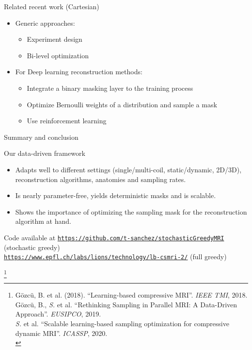 \begin{frame}{Related recent work (Cartesian) }


\begin{itemize}
\item Generic approaches:
\begin{itemize}
\item Experiment design \parencite{haldar2019oedipus}
\item Bi-level optimization \parencite{sherry2019learning}
\end{itemize}
\pause
\item For Deep learning reconstruction methods:
\begin{itemize}
\item Integrate a binary masking layer to the training process \parencite{weiss2019learning}
\item Optimize Bernoulli weights of a distribution and sample a mask \parencite{bahadir2019learning}
\item Use reinforcement learning \parencite{jin2019self}
\end{itemize}
\end{itemize}
\end{frame}
\begin{frame}{Summary and conclusion}
\begin{block}{Our data-driven framework}
\begin{itemize}
\item Adapts well to different settings (single/multi-coil, static/dynamic, 2D/3D), reconstruction algorithms, anatomies and sampling rates. 
\item Is nearly parameter-free, yields deterministic masks and is scalable.
\item Shows the importance of optimizing the sampling mask for the reconstruction algorithm at hand.
\end{itemize}
\end{block}

Code available at \href{https://github.com/t-sanchez/stochasticGreedyMRI}{\texttt{https://github.com/t-sanchez/stochasticGreedyMRI}} (stochastic greedy)\\ \href{https://www.epfl.ch/labs/lions/technology/lb-csmri-2/}{\texttt{https://www.epfl.ch/labs/lions/technology/lb-csmri-2/}} (full greedy)
	
\let\thefootnote\relax\footnote{\tiny  G\"ozc\"u, B. et al. (2018). ``Learning-based compressive MRI''. \textit{IEEE TMI}, 2018.\\
 G\"ozc\"u, B., \textit{S.} et al. ``Rethinking Sampling in Parallel MRI: A Data-Driven Approach''. \textit{EUSIPCO}, 2019.\\
\textit{S.} et al. ``Scalable learning-based sampling optimization for compressive dynamic MRI''.  \textit{ICASSP}, 2020. \\[3mm]}
\end{frame}


